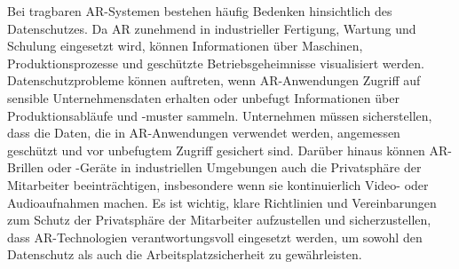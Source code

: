 Bei tragbaren AR-Systemen bestehen häufig Bedenken hinsichtlich des
Datenschutzes. Da AR zunehmend in industrieller Fertigung, Wartung und Schulung
eingesetzt wird, können Informationen über Maschinen, Produktionsprozesse und
geschützte Betriebsgeheimnisse visualisiert werden. Datenschutzprobleme können
auftreten, wenn AR-Anwendungen Zugriff auf sensible Unternehmensdaten erhalten
oder unbefugt Informationen über Produktionsabläufe und -muster sammeln.
Unternehmen müssen sicherstellen, dass die Daten, die in AR-Anwendungen
verwendet werden, angemessen geschützt und vor unbefugtem Zugriff gesichert
sind. Darüber hinaus können AR-Brillen oder -Geräte in industriellen Umgebungen
auch die Privatsphäre der Mitarbeiter beeinträchtigen, insbesondere wenn sie
kontinuierlich Video- oder Audioaufnahmen machen. Es ist wichtig, klare
Richtlinien und Vereinbarungen zum Schutz der Privatsphäre der Mitarbeiter
aufzustellen und sicherzustellen, dass AR-Technologien verantwortungsvoll
eingesetzt werden, um sowohl den Datenschutz als auch die 
Arbeitsplatzsicherheit zu gewährleisten.\cite{de2018augmented,9613426}